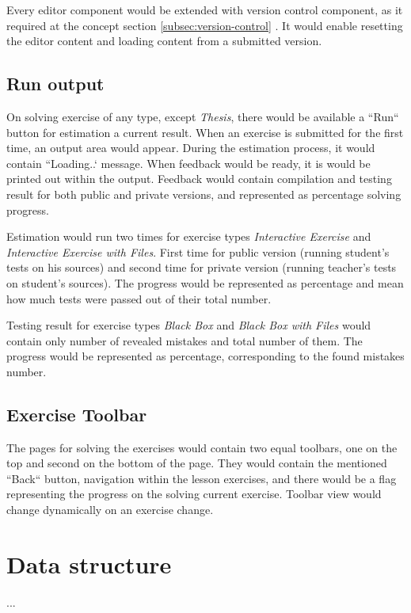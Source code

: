     Every editor component would be extended with version control component, as it required at the concept section \ref{subsec:version-control} . It would enable resetting the editor content and loading content from a submitted version.
    
    
    \subsection{Run output}
    On solving exercise of any type, except \textit{Thesis}, there would be available a ``Run`` button for estimation a current result. When an exercise is submitted for the first time, an output area would appear. During the estimation process, it would contain ``Loading..` message. When feedback would be ready, it is would be printed out within the output. Feedback would contain compilation and testing result for both public and private versions, and represented as percentage solving progress.
    
    Estimation would run two times for exercise types \textit{Interactive Exercise} and \textit{Interactive Exercise with Files}. First time for public version (running student's tests on his sources) and second time for private version (running teacher's tests on student's sources). The progress would be represented as percentage and mean how much tests were passed out of their total number.
    
    Testing result for exercise types \textit{Black Box} and \textit{Black Box with Files} would contain only number of revealed mistakes and total number of them. The progress would be represented as percentage, corresponding to the found mistakes number.
    
    
    \subsection{Exercise Toolbar}
    The pages for solving the exercises would contain two equal toolbars, one on the top and second on the bottom of the page. They would contain the mentioned ``Back`` button, navigation within the lesson exercises, and there would be a flag representing the progress on the solving current exercise. Toolbar view would change dynamically on an exercise change.


\section{Data structure}
...

